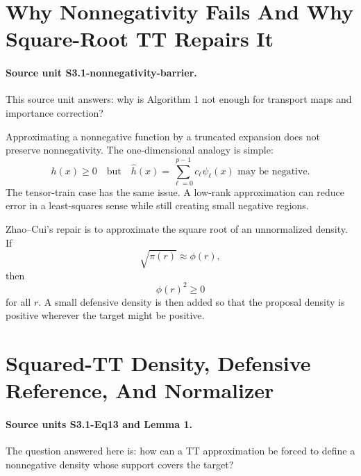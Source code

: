 \documentclass[11pt]{article}
\begin{document}
\section{Why Nonnegativity Fails And Why Square-Root TT Repairs It}

\paragraph{Source unit S3.1-nonnegativity-barrier.}
This source unit answers: why is Algorithm 1 not enough for transport maps and
importance correction?

Approximating a nonnegative function by a truncated expansion does not preserve
nonnegativity.  The one-dimensional analogy is simple:
\[
    h(x)\ge 0
    \quad\text{but}\quad
    \widehat h(x)=\sum_{\ell=0}^{p-1}c_\ell\psi_\ell(x)
    \text{ may be negative.}
\]
The tensor-train case has the same issue.  A low-rank approximation can reduce
error in a least-squares sense while still creating small negative regions.

Zhao--Cui's repair is to approximate the square root of an unnormalized density.
If
\[
    \sqrt{\pi(r)}\approx \phi(r),
\]
then
\[
    \phi(r)^2\ge 0
\]
for all \(r\).  A small defensive density is then added so that the proposal
density is positive wherever the target might be positive.

\section{Squared-TT Density, Defensive Reference, And Normalizer}

\paragraph{Source units S3.1-Eq13 and Lemma 1.}
The question answered here is: how can a TT approximation be forced to define a
nonnegative density whose support covers the target?
\end{document}
